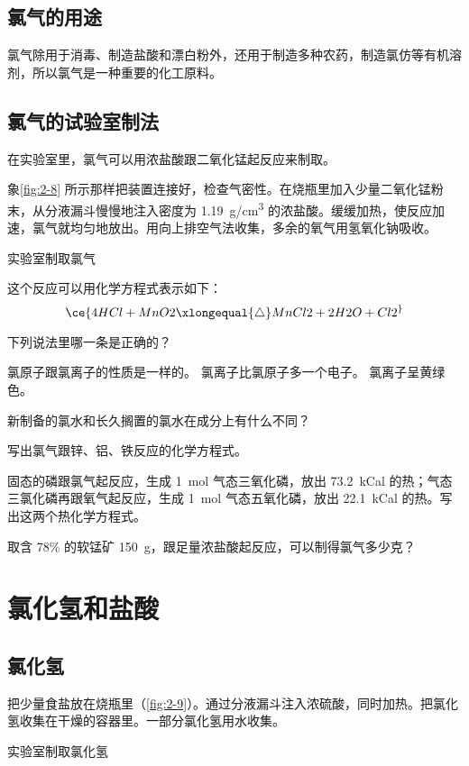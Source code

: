 \subsection{氯气的用途}
氯气除用于消毒、制造盐酸和漂白粉外，还用于制造多种农药，制造氯仿等有机溶剂，所以氯气是一种重要的化工原料。

\subsection{氯气的试验室制法}
在实验室里，氯气可以用浓盐酸跟二氧化锰起反应来制取。
\begin{Experiment}
  象\cref{fig:2-8} 所示那样把装置连接好，检查气密性。在烧瓶里加入少量二氧化锰粉末，从分液漏斗慢慢地注入密度为 \qty{1.19}{g/cm^3} 的浓盐酸。缓缓加热，使反应加速，氯气就均匀地放出。用向上排空气法收集，多余的氧气用氢氧化钠吸收。
  \tcblower
  \begin{figurehere}
    \caption{实验室制取氯气}\label{fig:2-8}
  \end{figurehere}
\end{Experiment}

这个反应可以用化学方程式表示如下：
\[ \ce{ 4HCl + MnO2 \xlongequal{\triangle} MnCl2 + 2H2O + Cl2 ^}\]

\begin{Practice}[习题]
  \begin{question}
    \item 下列说法里哪一条是正确的？
    \begin{tasks}
      \task 氯原子跟氯离子的性质是一样的。
      \task 氯离子比氯原子多一个电子。
      \task 氯离子呈黄绿色。
    \end{tasks}
    \item 新制备的氯水和长久搁置的氯水在成分上有什么不同？
    \item 写出氯气跟锌、铝、铁反应的化学方程式。
    \item 固态的磷跟氯气起反应，生成 \qty{1}{mol} 气态三氧化磷，放出 \qty{73.2}{kCal} 的热；气态三氯化磷再跟氧气起反应，生成  \qty{1}{mol} 气态五氧化磷，放出 \qty{22.1}{kCal} 的热。写出这两个热化学方程式。
    \item 取含 78\%  的软锰矿 \qty{150}{g}，跟足量浓盐酸起反应，可以制得氯气多少克？
  \end{question}
\end{Practice}
\section{氯化氢和盐酸}
\subsection{氯化氢}
\begin{Experiment}
  把少量食盐放在烧瓶里（\cref{fig:2-9}）。通过分液漏斗注入浓硫酸，同时加热。把氯化氢收集在干燥的容器里。一部分氯化氢用水收集。
  \tcblower
  \begin{figurehere}
    \caption{实验室制取氯化氢}\label{fig:2-9}
  \end{figurehere}
\end{Experiment}

